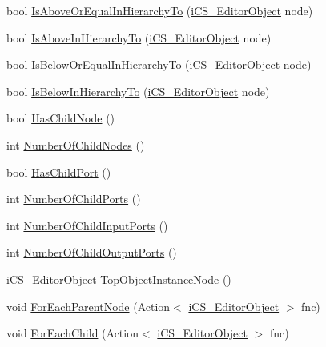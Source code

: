 \begin{DoxyCompactItemize}
\item 
bool \hyperlink{classi_c_s___editor_object_a4c04759945c72408c2b39a42ec5d3a18}{Is\+Above\+Or\+Equal\+In\+Hierarchy\+To} (\hyperlink{classi_c_s___editor_object}{i\+C\+S\+\_\+\+Editor\+Object} node)
\item 
bool \hyperlink{classi_c_s___editor_object_aa23d229c41d88440fea2fc6ec2afec54}{Is\+Above\+In\+Hierarchy\+To} (\hyperlink{classi_c_s___editor_object}{i\+C\+S\+\_\+\+Editor\+Object} node)
\item 
bool \hyperlink{classi_c_s___editor_object_a5647c49e1f0bb384fccc7b1f34d71410}{Is\+Below\+Or\+Equal\+In\+Hierarchy\+To} (\hyperlink{classi_c_s___editor_object}{i\+C\+S\+\_\+\+Editor\+Object} node)
\item 
bool \hyperlink{classi_c_s___editor_object_a7b48fa5c6e5c23e8e4e77053a91fb417}{Is\+Below\+In\+Hierarchy\+To} (\hyperlink{classi_c_s___editor_object}{i\+C\+S\+\_\+\+Editor\+Object} node)
\item 
bool \hyperlink{classi_c_s___editor_object_abde0c590e41273dfecd264ee62535996}{Has\+Child\+Node} ()
\item 
int \hyperlink{classi_c_s___editor_object_a62c88d4e52fc4dc348ea7fdeb470af91}{Number\+Of\+Child\+Nodes} ()
\item 
bool \hyperlink{classi_c_s___editor_object_a23e32cc06531b11b979f94be9829a6cc}{Has\+Child\+Port} ()
\item 
int \hyperlink{classi_c_s___editor_object_a6a733cce3ed5aa1146cd8865113c31c8}{Number\+Of\+Child\+Ports} ()
\item 
int \hyperlink{classi_c_s___editor_object_aff5a8688d3c036e5f01993265b014985}{Number\+Of\+Child\+Input\+Ports} ()
\item 
int \hyperlink{classi_c_s___editor_object_a2bd8c5c5d375c085f6c2a6b8f05b0d85}{Number\+Of\+Child\+Output\+Ports} ()
\item 
\hyperlink{classi_c_s___editor_object}{i\+C\+S\+\_\+\+Editor\+Object} \hyperlink{classi_c_s___editor_object_ae951644eb38f9deef8554b1032d80231}{Top\+Object\+Instance\+Node} ()
\item 
void \hyperlink{classi_c_s___editor_object_ad0d3d9b30fc7226607e7bb8725e775e8}{For\+Each\+Parent\+Node} (Action$<$ \hyperlink{classi_c_s___editor_object}{i\+C\+S\+\_\+\+Editor\+Object} $>$ fnc)
\item 
void \hyperlink{classi_c_s___editor_object_ae1883c9eb18d154de881be7c04f76903}{For\+Each\+Child} (Action$<$ \hyperlink{classi_c_s___editor_object}{i\+C\+S\+\_\+\+Editor\+Object} $>$ fnc)
\item 

\end{DoxyCompactItemize}
